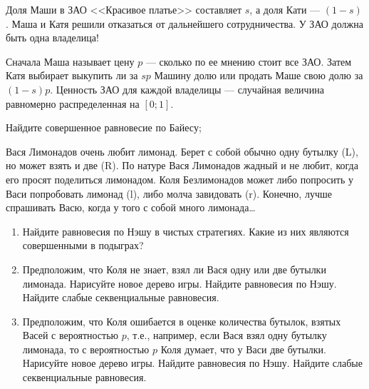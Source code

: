 \begin{problem}
Доля Маши в ЗАО <<Красивое платье>> составляет  $s$, а доля Кати ---  $\left(1-s\right)$. Маша и Катя решили отказаться от дальнейшего сотрудничества. У ЗАО должна быть одна владелица!\par
Сначала Маша называет цену  $p$  --- сколько по ее мнению стоит все ЗАО. Затем Катя выбирает выкупить ли за  $sp$  Машину долю или продать Маше свою долю за  $\left(1-s\right)p$.
Ценность ЗАО для каждой владелицы --- случайная величина равномерно распределенная на  $\left[0;1\right]$.\par
Найдите совершенное равновесие по Байесу;\par



\begin{sol}

\end{sol}
\end{problem}





\begin{problem}
Вася Лимонадов очень любит лимонад. Берет с собой обычно одну бутылку (L), но может взять и две (R). По натуре Вася Лимонадов жадный и не любит, когда его просят поделиться лимонадом. Коля Безлимонадов может либо попросить у Васи попробовать лимонад (l), либо молча завидовать (r). Конечно, лучше спрашивать Васю, когда у того с собой много лимонада\ldots \par
{}

\begin{enumerate}
\item Найдите равновесия по Нэшу в чистых стратегиях. Какие из них являются совершенными в подыграх?\par
\item Предположим, что Коля не знает, взял ли Вася одну или две бутылки лимонада. Нарисуйте новое дерево игры. Найдите равновесия по Нэшу. Найдите слабые секвенциальные равновесия.\par
\item  Предположим, что Коля ошибается в оценке количества бутылок, взятых Васей с вероятностью  $p$, т.е., например, если Вася взял одну бутылку лимонада, то с вероятностью  $p$  Коля думает, что у Васи две бутылки. Нарисуйте новое дерево игры. Найдите равновесия по Нэшу. Найдите слабые секвенциальные равновесия.\par
\end{enumerate}


\begin{sol}

\end{sol}
\end{problem}



